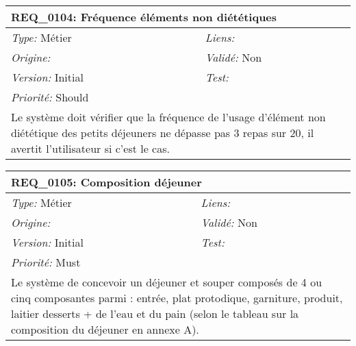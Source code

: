\begin{table}[!h]

\begin{tabular}{|p{60mm}p{100mm}|}

\hline

\multicolumn{2}{|l|}{\textbf{REQ\_0104:} Fréquence éléments non diététiques} \\ \hline

\emph{Type:} Métier & \emph{Liens:}  \\

\emph{Origine:}  & \emph{Validé:} Non \\

\emph{Version:} Initial & \emph{Test:}  \\

\emph{Priorité:} Should & \\ \hline

\multicolumn{2}{|p{16cm}|}{Le système doit vérifier que la fréquence de l'usage d'élément non diététique des petits déjeuners ne dépasse pas 3 repas sur 20, il avertit l'utilisateur si c'est le cas.} \\ \hline

\end{tabular}

\end{table}



\begin{table}[!h]

\begin{tabular}{|p{60mm}p{100mm}|}

\hline

\multicolumn{2}{|l|}{\textbf{REQ\_0105:} Composition déjeuner} \\ \hline

\emph{Type:} Métier & \emph{Liens:}  \\

\emph{Origine:}  & \emph{Validé:} Non \\

\emph{Version:} Initial & \emph{Test:}  \\

\emph{Priorité:} Must & \\ \hline

\multicolumn{2}{|p{16cm}|}{Le système de concevoir un déjeuner et souper composés de 4 ou cinq composantes parmi : entrée, plat protodique, garniture, produit, laitier desserts + de l'eau et du pain (selon le tableau sur la composition du déjeuner en annexe A).} \\ \hline

\end{tabular}

\end{table}



